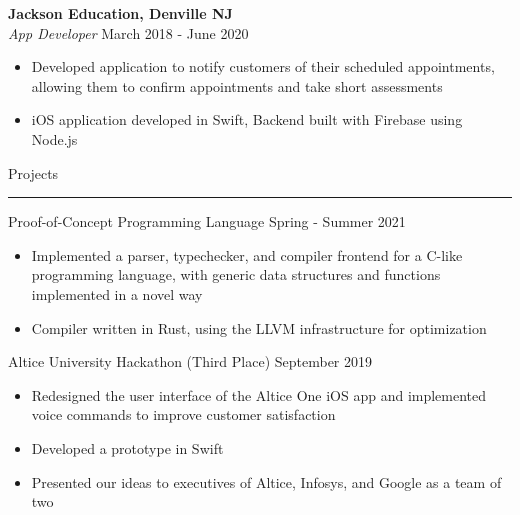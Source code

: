 \documentclass{article}
\newcommand \spacingBetweenHeadings {0.3em}
\newcommand \spacingAfterHeadings {0.5em}
\begin{document}
\noindent
\textbf{Jackson Education, Denville NJ}\\
\textit{App Developer}
\hfill
March 2018 - June 2020\\
\vspace{-1em}
\begin{itemize}
\item Developed application to notify customers of their scheduled appointments, allowing them to \mbox{confirm} appointments and take short assessments
\item iOS application developed in Swift, Backend built with Firebase using Node.js
\end{itemize}


\vspace{\spacingBetweenHeadings}

\noindent
\huge Projects\par
\vspace{0.1em}
\hrule
\Large
\vspace{\spacingAfterHeadings}


\iffalse %

\noindent
Compiler for Small Imperative Language
\hfill
Spring 2020\\
\vspace{-1em}
\begin{itemize}
\item Implemented a parser, typechecker, frontend, and optimizing backend for an imperative programming language as part of a class on compiler design
\item Compiler written in OCaml using LLVM as a middle-end and x86 as the target architecture
\end{itemize}

\fi

\noindent
Proof-of-Concept Programming Language
\hfill
Spring - Summer 2021\\
\vspace{-1em}
\begin{itemize}
\item Implemented a parser, typechecker, and compiler frontend for a C-like programming language, with generic data structures and functions implemented in a novel way
\item Compiler written in Rust, using the LLVM infrastructure for optimization
\end{itemize}



\noindent
Altice University Hackathon (Third Place)
\hfill
September 2019\\
\vspace{-1em}
\begin{itemize}
\item Redesigned the user interface of the Altice One iOS app and implemented voice commands to improve customer satisfaction
\item Developed a prototype in Swift
\item Presented our ideas to executives of Altice, Infosys, and Google as a team of two
\end{itemize}
\end{document}
